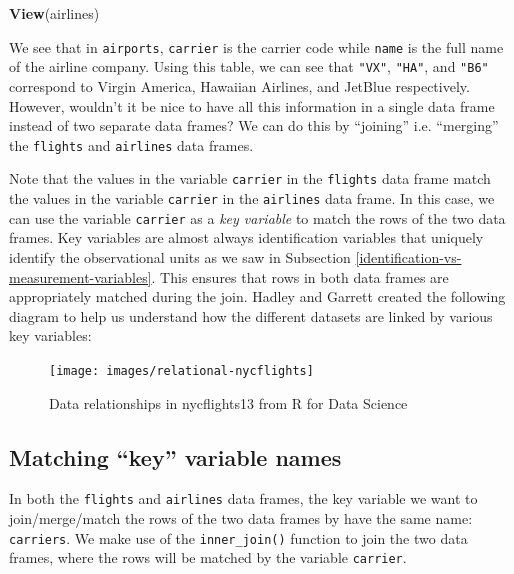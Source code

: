 \documentclass[12pt, krantz2,]{krantz}
\makeatletter
\newenvironment{Shaded}{\begin{snugshade}}{\end{snugshade}}
\newcommand{\KeywordTok}[1]{\textcolor[rgb]{0.27,0.27,0.27}{\textbf{#1}}}
\newcommand{\NormalTok}[1]{#1}
\newenvironment{kframe}{%
\medskip{}
\setlength{\fboxsep}{.8em}
 \def\at@end@of@kframe{}%
 \ifinner\ifhmode%
  \def\at@end@of@kframe{\end{minipage}}%
  \begin{minipage}{\columnwidth}%
 \fi\fi%
 \def\FrameCommand##1{\hskip\@totalleftmargin \hskip-\fboxsep
 \colorbox{shadecolor}{##1}\hskip-\fboxsep
     \hskip-\linewidth \hskip-\@totalleftmargin \hskip\columnwidth}%
 \MakeFramed {\advance\hsize-\width
   \@totalleftmargin\z@ \linewidth\hsize
   \@setminipage}}%
 {\par\unskip\endMakeFramed%
 \at@end@of@kframe}
\renewenvironment{Shaded}{\begin{kframe}}{\end{kframe}}
\makeatother
\begin{document}
\begin{Shaded}
\begin{Highlighting}[]
\KeywordTok{View}\NormalTok{(airlines)}
\end{Highlighting}
\end{Shaded}

We see that in \texttt{airports}, \texttt{carrier} is the carrier code while \texttt{name} is the full name of the airline company. Using this table, we can see that \texttt{"VX"}, \texttt{"HA"}, and \texttt{"B6"} correspond to Virgin America, Hawaiian Airlines, and JetBlue respectively. However, wouldn't it be nice to have all this information in a single data frame instead of two separate data frames? We can do this by ``joining'' i.e. ``merging'' the \texttt{flights} and \texttt{airlines} data frames.

Note that the values in the variable \texttt{carrier} in the \texttt{flights} data frame match the values in the variable \texttt{carrier} in the \texttt{airlines} data frame. In this case, we can use the variable \texttt{carrier} as a \emph{key variable} to match the rows of the two data frames. Key variables are almost always identification variables that uniquely identify the observational units as we saw in Subsection \ref{identification-vs-measurement-variables}. This ensures that rows in both data frames are appropriately matched during the join. Hadley and Garrett \citep{rds2016} created the following diagram to help us understand how the different datasets are linked by various key variables:

\begin{figure}

{\centering \texttt{[image: images/relational-nycflights]} 

}

\caption{Data relationships in nycflights13 from R for Data Science}\label{fig:reldiagram}
\end{figure}

\hypertarget{matching-key-variable-names}{%
\subsection{Matching ``key'' variable names}\label{matching-key-variable-names}}

In both the \texttt{flights} and \texttt{airlines} data frames, the key variable we want to join/merge/match the rows of the two data frames by have the same name: \texttt{carriers}. We make use of the \texttt{inner\_join()} function to join the two data frames, where the rows will be matched by the variable \texttt{carrier}.
\end{document}
